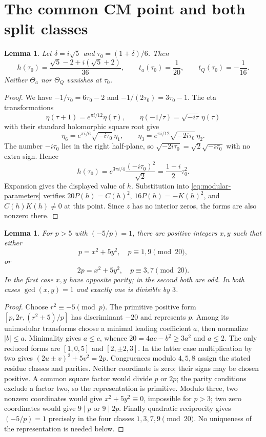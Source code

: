 \documentclass[11pt,a4paper]{article}
\newtheorem{lemma}[theorem]{Lemma}
\theoremstyle{remark}
\begin{document}
\section{The common CM point and both split classes}\label{sec:split}
\begin{lemma}\label{lem:cm}
Let $\delta=i\sqrt5$ and $\tau_0=(1+\delta)/6$. Then
\[
 h(\tau_0)=\frac{\sqrt5-2+i(\sqrt5+2)}{36},\qquad
 t_a(\tau_0)=\frac1{20},\qquad t_Q(\tau_0)=-\frac1{16}.
\]
Neither $\Theta_a$ nor $\Theta_Q$ vanishes at $\tau_0$.
\end{lemma}
\begin{proof}
We have $-1/\tau_0=6\tau_0-2$ and
$-1/(2\tau_0)=3\tau_0-1$. The eta transformations
\cite[\S23.18, (23.18.5)--(23.18.7)]{dlmf}
\[
 \eta(\tau+1)=e^{\pi i/12}\eta(\tau),\qquad
 \eta(-1/\tau)=\sqrt{-i\tau}\,\eta(\tau)
\]
with their standard holomorphic square root give
\[
 \eta_6=e^{\pi i/6}\sqrt{-i\tau_0}\,\eta_1,
 \qquad
 \eta_3=e^{\pi i/12}\sqrt{-2i\tau_0}\,\eta_2.
\]
The number $-i\tau_0$ lies in the right half-plane, so
$\sqrt{-2i\tau_0}=\sqrt2\sqrt{-i\tau_0}$ with no extra sign.
Hence
\[
 h(\tau_0)=e^{3\pi i/4}\frac{(-i\tau_0)^2}{\sqrt2}
           =\frac{1-i}{2}\tau_0^2.
\]
Expansion gives the displayed value of $h$. Substitution into
\eqref{eq:modular-parameters} verifies $20P(h)=C(h)^2$,
$16P(h)=-K(h)^2$, and $C(h)K(h)\ne0$ at this point.
Since $z$ has no interior zeros, the forms are also nonzero there.
\end{proof}

\begin{lemma}\label{lem:forms}
For $p>5$ with $(-5/p)=1$, there are positive integers $x,y$ such
that either
\[
 p=x^2+5y^2,\quad p\equiv1,9\pmod{20},
\]
or
\[
 2p=x^2+5y^2,\quad p\equiv3,7\pmod{20}.
\]
In the first case $x,y$ have opposite parity; in the second both are
odd. In both cases $\gcd(x,y)=1$ and exactly one is divisible by $3$.
\end{lemma}
\begin{proof}
Choose $r^2\equiv-5\pmod p$. The primitive positive form
$[p,2r,(r^2+5)/p]$ has discriminant $-20$ and represents $p$.
Among its unimodular transforms choose a minimal leading coefficient
$a$, then normalize $|b|\le a$. Minimality gives $a\le c$, whence
$20=4ac-b^2\ge3a^2$ and $a\le2$. The only reduced forms are
$[1,0,5]$ and $[2,\pm2,3]$. In the latter case multiplication by
two gives $(2u\pm v)^2+5v^2=2p$.
Congruences modulo $4,5,8$ assign the stated residue classes and
parities. Neither coordinate is zero; their signs may be chosen
positive. A common square factor would divide $p$ or $2p$; the parity
conditions exclude a factor two, so the representation is primitive.
Modulo three, two nonzero coordinates would give
$x^2+5y^2\equiv0$, impossible for $p>3$; two zero coordinates would
give $9\mid p$ or $9\mid2p$.
Finally quadratic reciprocity gives $(-5/p)=1$ precisely in the
four classes $1,3,7,9\pmod{20}$. No uniqueness of the representation
is needed below.
\end{proof}
\end{document}
